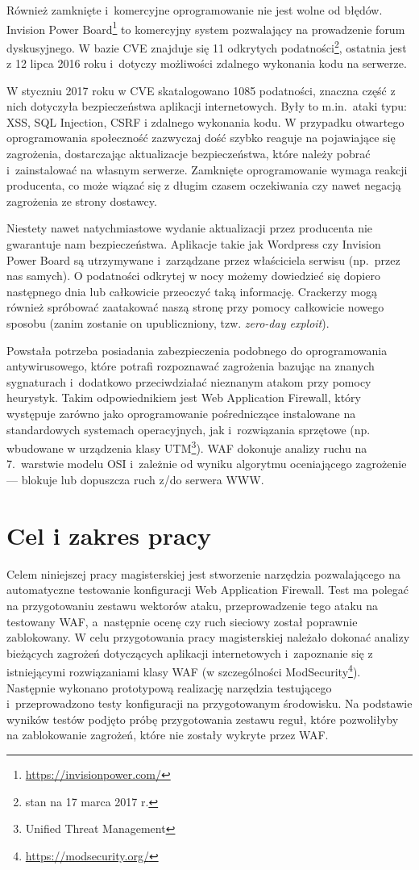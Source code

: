 \documentclass[11pt,a4paper,polish,thesis]{dcsbook}
\begin{document}
Również zamknięte i~komercyjne oprogramowanie nie jest wolne od błędów. Invision Power Board\footnote{\url{https://invisionpower.com/}} to komercyjny system pozwalający na prowadzenie forum dyskusyjnego. W bazie CVE znajduje się 11 odkrytych podatności\footnote{stan na 17 marca 2017 r.}, ostatnia jest z 12 lipca 2016 roku i~dotyczy możliwości zdalnego wykonania kodu na serwerze.

W styczniu 2017 roku w CVE skatalogowano 1085 podatności, znaczna część z nich dotyczyła bezpieczeństwa aplikacji internetowych. Były to m.in.\ ataki typu: XSS, SQL Injection, CSRF i zdalnego wykonania kodu. W przypadku otwartego oprogramowania społeczność zazwyczaj dość szybko reaguje na pojawiające się zagrożenia, dostarczając aktualizacje bezpieczeństwa, które należy pobrać i~zainstalować na własnym serwerze. Zamknięte oprogramowanie wymaga reakcji producenta, co może wiązać się z długim czasem oczekiwania czy nawet negacją zagrożenia ze strony dostawcy.

Niestety nawet natychmiastowe wydanie aktualizacji przez producenta nie gwarantuje nam bezpieczeństwa. Aplikacje takie jak Wordpress czy Invision Power Board są utrzymywane i~zarządzane przez właściciela serwisu (np.\ przez nas samych). O podatności odkrytej w nocy możemy dowiedzieć się dopiero następnego dnia lub całkowicie przeoczyć taką informację. Crackerzy mogą również spróbować zaatakować naszą stronę przy pomocy całkowicie nowego sposobu (zanim zostanie on upubliczniony, tzw. \textit{zero-day exploit}).

Powstała potrzeba posiadania zabezpieczenia podobnego do oprogramowania antywirusowego, które potrafi rozpoznawać zagrożenia bazując na znanych sygnaturach i~dodatkowo przeciwdziałać nieznanym atakom przy pomocy heurystyk. Takim odpowiednikiem jest Web Application Firewall, który występuje zarówno jako oprogramowanie pośredniczące instalowane na standardowych systemach operacyjnych, jak i~rozwiązania sprzętowe (np. wbudowane w urządzenia klasy UTM\footnote{Unified Threat Management}). WAF dokonuje analizy ruchu na 7.~warstwie modelu OSI i~zależnie od wyniku algorytmu oceniającego zagrożenie --- blokuje lub dopuszcza ruch z/do serwera WWW.  

\section*{Cel i zakres pracy}
Celem niniejszej pracy magisterskiej jest stworzenie narzędzia pozwalającego na automatyczne testowanie konfiguracji Web Application Firewall. Test ma polegać na przygotowaniu zestawu wektorów ataku, przeprowadzenie tego ataku na testowany WAF, a~następnie ocenę czy ruch sieciowy został poprawnie zablokowany. W celu przygotowania pracy magisterskiej należało dokonać analizy bieżących zagrożeń dotyczących aplikacji internetowych i~zapoznanie się z istniejącymi rozwiązaniami klasy WAF (w szczególności ModSecurity\footnote{\url{https://modsecurity.org/}}). Następnie wykonano prototypową realizację narzędzia testującego i~przeprowadzono testy konfiguracji na przygotowanym środowisku. Na podstawie wyników testów podjęto próbę przygotowania zestawu reguł, które pozwoliłyby na zablokowanie zagrożeń, które nie zostały wykryte przez WAF.
\end{document}
